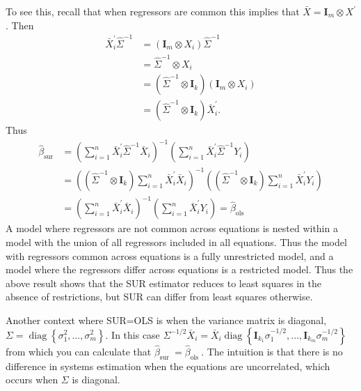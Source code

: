 \documentclass[10pt]{article}
\begin{document}
To see this, recall that when regressors are common this implies that $\bar{X}=\boldsymbol{I}_{m} \otimes X^{\prime}$. Then
$$
\begin{aligned}
\bar{X}_{i}^{\prime} \widehat{\Sigma}^{-1} &=\left(\boldsymbol{I}_{m} \otimes X_{i}\right) \widehat{\Sigma}^{-1} \\
&=\widehat{\Sigma}^{-1} \otimes X_{i} \\
&=\left(\widehat{\Sigma}^{-1} \otimes \boldsymbol{I}_{k}\right)\left(\boldsymbol{I}_{m} \otimes X_{i}\right) \\
&=\left(\widehat{\Sigma}^{-1} \otimes \boldsymbol{I}_{k}\right) \bar{X}_{i}^{\prime} .
\end{aligned}
$$
Thus
$$
\begin{aligned}
\widehat{\beta}_{\mathrm{sur}} &=\left(\sum_{i=1}^{n} \bar{X}_{i}^{\prime} \widehat{\Sigma}^{-1} \bar{X}_{i}\right)^{-1}\left(\sum_{i=1}^{n} \bar{X}_{i}^{\prime} \widehat{\Sigma}^{-1} Y_{i}\right) \\
&=\left(\left(\widehat{\Sigma}^{-1} \otimes \boldsymbol{I}_{k}\right) \sum_{i=1}^{n} \bar{X}_{i}^{\prime} \bar{X}_{i}\right)^{-1}\left(\left(\widehat{\Sigma}^{-1} \otimes \boldsymbol{I}_{k}\right) \sum_{i=1}^{n} \bar{X}_{i}^{\prime} Y_{i}\right) \\
&=\left(\sum_{i=1}^{n} \bar{X}_{i}^{\prime} \bar{X}_{i}\right)^{-1}\left(\sum_{i=1}^{n} \bar{X}_{i}^{\prime} Y_{i}\right)=\widehat{\beta}_{\mathrm{ols}}
\end{aligned}
$$
A model where regressors are not common across equations is nested within a model with the union of all regressors included in all equations. Thus the model with regressors common across equations is a fully unrestricted model, and a model where the regressors differ across equations is a restricted model. Thus the above result shows that the SUR estimator reduces to least squares in the absence of restrictions, but SUR can differ from least squares otherwise.

Another context where SUR=OLS is when the variance matrix is diagonal, $\Sigma=\operatorname{diag}\left\{\sigma_{1}^{2}, \ldots, \sigma_{m}^{2}\right\}$. In this case $\Sigma^{-1 / 2} \bar{X}_{i}=\bar{X}_{i} \operatorname{diag}\left\{\boldsymbol{I}_{k_{1}} \sigma_{1}^{-1 / 2}, \ldots, \boldsymbol{I}_{k_{m}} \sigma_{m}^{-1 / 2}\right\}$ from which you can calculate that $\widehat{\beta}_{\text {sur }}=\widehat{\beta}_{\text {ols }}$. The intuition is that there is no difference in systems estimation when the equations are uncorrelated, which occurs when $\Sigma$ is diagonal.
\end{document}
